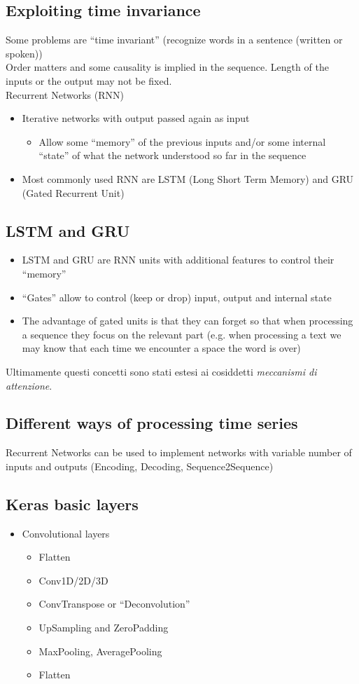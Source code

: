 \subsection{Exploiting time invariance}

Some problems are “time invariant” (recognize words in a sentence (written or spoken))\\
Order matters and some causality is implied in the sequence. Length of the inputs or the output may not be fixed.\\

Recurrent Networks (RNN)
\begin{itemize}
	\item Iterative networks with output passed again as input
	\begin{itemize}
		\item Allow some “memory” of the previous inputs and/or some internal “state” of what the network understood so far in the sequence
	\end{itemize}
	\item Most commonly used RNN are LSTM (Long Short Term Memory) and GRU (Gated Recurrent Unit)
\end{itemize}

\subsection{LSTM and GRU}
\begin{itemize}
	\item LSTM and GRU are RNN units with additional features to control their “memory”
	\item “Gates” allow to control (keep or drop) input, output and internal state
	\item The advantage of gated units is that they can forget so
	that when processing a sequence they focus on the
	relevant part (e.g. when processing a text we may know that each time we encounter a space the word is over)
\end{itemize}

Ultimamente questi concetti sono stati estesi ai cosiddetti \textit{meccanismi di attenzione}.

\subsection{Different ways of processing time series}

Recurrent Networks can be used to implement networks with variable number of inputs and outputs (Encoding, Decoding, Sequence2Sequence)


\subsection{Keras basic layers}

\begin{itemize}
	\item Convolutional layers
	\begin{itemize}
		\item Flatten
		\item Conv1D/2D/3D
		\item ConvTranspose or “Deconvolution”
		\item UpSampling and ZeroPadding
		\item MaxPooling, AveragePooling
		\item Flatten
	\end{itemize}
\end{itemize}